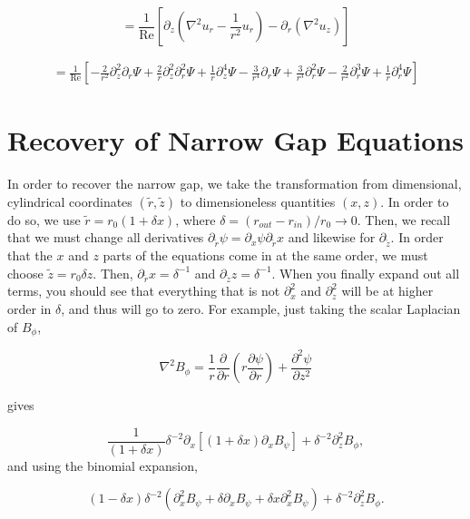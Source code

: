 \documentclass{paper}
\newcommand{\beq}{\begin{equation}}
\newcommand{\eeq}{\end{equation}}
\newcommand\reye{\mathrm{Re}}
\begin{document}
\beq
= \frac{1}{\reye}\left[\partial_z \left(\nabla^2 u_r - \frac{1}{r^2} u_r\right) - \partial_r \left(\nabla^2 u_z\right)\right]
\eeq

\begin{multline}
= \frac{1}{\reye} \left[ - \frac{2}{r^2} \partial_z^2 \partial_r \Psi + \frac{2}{r} \partial_z^2 \partial_r^2 \Psi + \frac{1}{r} \partial_z^4 \Psi - \frac{3}{r^4} \partial_r \Psi + \frac{3}{r^3} \partial_r^2 \Psi - \frac{2}{r^2} \partial_r^3 \Psi + \frac{1}{r} \partial_r^4 \Psi \right]
\end{multline}


\section{Recovery of Narrow Gap Equations}
\label{sec:narrow_gap_recovery}

In order to recover the narrow gap, we take the transformation from dimensional, cylindrical coordinates $(\widetilde{r},\widetilde{z})$ to dimensioneless quantities $(x,z)$. In order to do so, we use $\widetilde{r} = r_0 (1 + \delta x)$, where $\delta = (r_{out} - r_{in})/r_0 \to 0$. Then, we recall that we must change all derivatives $\partial_{\widetilde{r}} \psi = \partial_x \psi \partial_{\widetilde{r}} x$ and likewise for $\partial_{\widetilde{z}}$. In order that the $x$ and $z$ parts of the equations come in at the same order, we must choose $\widetilde{z} = r_0 \delta z$. Then, $\partial_{\widetilde{r}} x = \delta^{-1}$ and $\partial_{\widetilde{z}} z = \delta^{-1}$. When you finally expand out all terms, you should see that everything that is not $\partial^2_x$ and $\partial^2_z$ will be at higher order in $\delta$, and thus will go to zero. For example, just taking the scalar Laplacian of $B_\phi$, 

\begin{equation}
  \nabla^2 B_\phi = \frac{1}{r} \frac{\partial}{\partial r}\left(r \frac{\partial \psi}{\partial r} \right) + \frac{\partial^2 \psi}{\partial z^2}
\end{equation}

gives

\begin{equation}
  \frac{1}{(1 + \delta x)} \delta^{-2} \partial_x \left[(1 + \delta x) \partial_x B_\psi \right] + \delta^{-2} \partial_z^2 B_\phi,
\end{equation}
and using the binomial expansion, 

\begin{equation}
  (1 - \delta x) \delta^{-2} \left(\partial_x^2 B_\psi + \delta \partial_x B_\psi + \delta x \partial_x^2 B_\psi \right) + \delta^{-2} \partial_z^2 B_\phi.
\end{equation}
\end{document}
